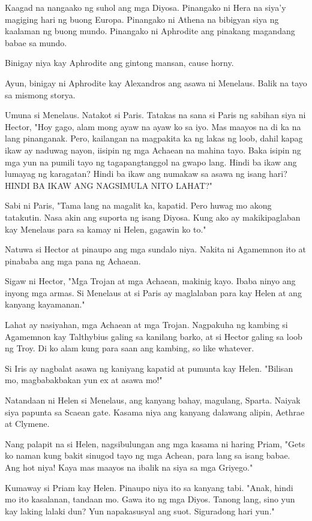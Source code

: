 \documentclass[12pt,letterpaper]{report}
\begin{document}
Kaagad na nangaako ng suhol ang mga Diyosa. Pinangako ni Hera na siya'y magiging hari ng buong Europa.
Pinangako ni Athena na bibigyan siya ng kaalaman ng buong mundo. Pinangako ni Aphrodite ang pinakang magandang babae sa mundo.

Binigay niya kay Aphrodite ang gintong mansan, cause horny.

Ayun, binigay ni Aphrodite kay Alexandros ang asawa ni Menelaus. Balik na tayo sa mismong storya.

Umuna si Menelaus. Natakot si Paris. Tatakas na sana si Paris ng sabihan siya ni Hector,
"Hoy gago, alam mong ayaw na ayaw ko sa iyo. Mas maayos na di ka na lang pinanganak. Pero,
kailangan na magpakita ka ng lakas ng loob, dahil kapag ikaw ay naduwag nayon, iisipin ng mga Achaean na mahina tayo.
Baka isipin ng mga yun na pumili tayo ng tagapangtanggol na gwapo lang.
Hindi ba ikaw ang lumayag ng karagatan? Hindi ba ikaw ang numakaw sa asawa ng isang hari?
HINDI BA IKAW ANG NAGSIMULA NITO LAHAT?"

Sabi ni Paris, "Tama lang na magalit ka, kapatid. Pero huwag mo akong tatakutin.
Nasa akin ang suporta ng isang Diyosa. Kung ako ay makikipaglaban kay Menelaus para sa kamay ni Helen,
gagawin ko to."

Natuwa si Hector at pinaupo ang mga sundalo niya. Nakita ni Agamemnon ito at pinababa ang mga pana ng Achaean.

Sigaw ni Hector, "Mga Trojan at mga Achaean, makinig kayo. Ibaba ninyo ang inyong mga armas.
Si Menelaus at si Paris ay maglalaban para kay Helen at ang kanyang kayamanan."

Lahat ay nasiyahan, mga Achaean at mga Trojan. Nagpakuha ng kambing si Agamemnon kay Talthybius galing sa kanilang barko,
at si Hector galing sa loob ng Troy. Di ko alam kung para saan ang kambing, so like whatever.

Si Iris ay nagbalat asawa ng kaniyang kapatid at pumunta kay Helen. "Bilisan mo,
magbabakbakan yun ex at asawa mo!"

Natandaan ni Helen si Menelaus, ang kanyang bahay, magulang, Sparta. Naiyak siya papunta sa Scaean gate.
Kasama niya ang kanyang dalawang alipin, Aethrae at Clymene.

Nang palapit na si Helen, nagsibulungan ang mga kasama ni haring Priam,
"Gets ko naman kung bakit sinugod tayo ng mga Achean, para lang sa isang babae. Ang hot niya!
Kaya mas maayos na ibalik na siya sa mga Griyego."

Kumaway si Priam kay Helen. Pinaupo niya ito sa kanyang tabi. "Anak, hindi mo ito kasalanan, tandaan mo.
Gawa ito ng mga Diyos. Tanong lang, sino yun kay laking lalaki dun? Yun napakasusyal ang suot. Siguradong hari yun."
\end{document}

